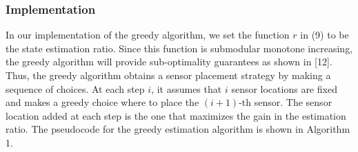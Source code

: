 \documentclass[journal]{IEEEtran}
\begin{document}
\subsubsection{Implementation}
In our implementation of the greedy algorithm, we set the function $r$ in (9) to be the state estimation ratio. Since this function is submodular monotone increasing, the greedy algorithm will provide sub-optimality guarantees as shown in [12]. Thus, the greedy algorithm obtains a sensor placement strategy by making a sequence of choices. At each step $i$, it assumes that $i$ sensor locations are fixed and makes a greedy choice where to place the $(i + 1)$-th sensor. The sensor location added at each step is the one that maximizes the gain in the estimation ratio. The pseudocode for the greedy estimation algorithm is shown in Algorithm 1.
\end{document}

